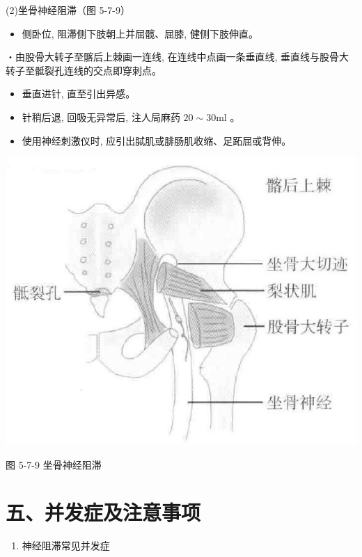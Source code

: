 \documentclass[10pt]{article}
\begin{document}
(2)坐骨神经阻滞（图 5-7-9）

\begin{itemize}
  \item 侧卧位, 阻滞侧下肢朝上并屈髋、屈膝, 健侧下肢伸直。
\end{itemize}

・由股骨大转子至髂后上棘画一连线, 在连线中点画一条垂直线, 垂直线与股骨大转子至骶裂孔连线的交点即穿刺点。

\begin{itemize}
  \item 垂直进针, 直至引出异感。
  \item 针稍后退, 回吸无异常后, 注人局麻药 $20 \sim 30 \mathrm{ml}$ 。
  \item 使用神经刺激仪时, 应引出脦肌或腓肠肌收缩、足跖屈或背伸。
\end{itemize}

\begin{center}
\includegraphics[max width=\textwidth]{2024_07_05_645bb794a4d4f32ee0c8g-323}
\end{center}

图 5-7-9 坐骨神经阻滞

\section*{五、并发症及注意事项}
\begin{enumerate}
  \item 神经阻滞常见并发症
\end{enumerate}
\end{document}
